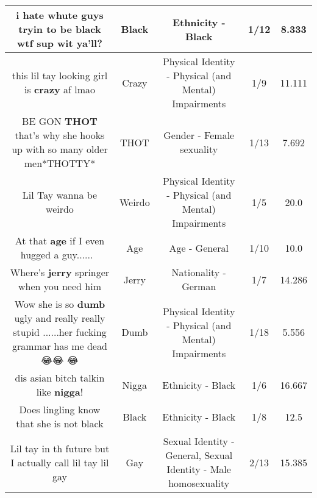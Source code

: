 \documentclass[11pt]{article}
\newlength\mylength
\begin{document}
\begin{center}
\begin{longtable}{|C{.65\mylength}|C{.30\mylength}|C{.12\mylength}|C{.12\mylength}|C{.12\mylength}|}
  \small i hate whute guys tryin to be \textbf{black} wtf sup wit ya'll?\normalsize   & Black & Ethnicity - Black & 1/12 & 8.333 \\  \hline
  \small this lil tay looking girl is \textbf{crazy} af lmao\normalsize   & Crazy & Physical Identity - Physical (and Mental) Impairments & 1/9 & 11.111 \\  \hline
  \small BE GON \textbf{THOT}   that's why she hooks up with so many older men*THOTTY*\normalsize   & THOT & Gender - Female sexuality & 1/13 & 7.692 \\  \hline
  \small Lil Tay wanna be weirdo\normalsize   & Weirdo & Physical Identity - Physical (and Mental) Impairments & 1/5 & 20.0 \\  \hline
  \small At that \textbf{age} if I even hugged a guy...... 😬\normalsize   & Age & Age - General & 1/10 & 10.0 \\  \hline
  \small Where's \textbf{jerry} springer when you need him\normalsize   & Jerry & Nationality - German & 1/7 & 14.286 \\  \hline
  \small Wow she is so \textbf{dumb} ugly and really really stupid ......her fucking grammar has me dead 😂😂 😂\normalsize   & Dumb & Physical Identity - Physical (and Mental) Impairments & 1/18 & 5.556 \\  \hline
  \small dis asian bitch talkin like \textbf{nigga}!\normalsize   & Nigga & Ethnicity - Black & 1/6 & 16.667 \\  \hline
  \small Does lingling know that she is not black\normalsize   & Black & Ethnicity - Black & 1/8 & 12.5 \\  \hline
  \small Lil tay in th future but I actually call lil tay lil gay\normalsize   & Gay & Sexual Identity - General, Sexual Identity - Male homosexuality & 2/13 & 15.385 \\  \hline

\end{longtable}
\end{center}
\end{document}

